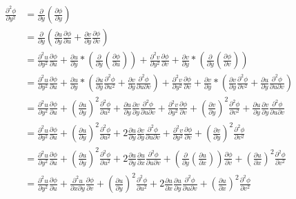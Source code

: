 \documentclass{article}
\begin{document}
\begin{equation*}
\begin{split}
    \frac{\partial^2\phi}{\partial y^2}&=
    \frac{\partial}{\partial y}(\frac{\partial\phi}{\partial y})\\&=
    \frac{\partial}{\partial y}(\frac{\partial u}{\partial y}\frac{\partial\phi}{\partial u}+\frac{\partial v}{\partial y}\frac{\partial\phi}{\partial v})\\&=
    \frac{\partial^2 u}{\partial y^2}\frac{\partial \phi}{\partial u}+\frac{\partial u}{\partial y}*(\frac{\partial }{\partial y}(\frac{\partial \phi}{\partial u}))+\frac{\partial^2 v}{\partial y^2}\frac{\partial \phi}{\partial v}+\frac{\partial v}{\partial y}*(\frac{\partial }{\partial y}(\frac{\partial \phi}{\partial v}))\\&=
    \frac{\partial^2 u}{\partial y^2}\frac{\partial \phi}{\partial u}+\frac{\partial u}{\partial y}*(\frac{\partial u}{\partial y}\frac{\partial^2 \phi}{\partial u^2}+\frac{\partial v}{\partial y}\frac{\partial^2 \phi}{\partial u \partial v})+\frac{\partial^2 v}{\partial y^2}\frac{\partial \phi}{\partial v}+\frac{\partial v}{\partial y}*(\frac{\partial  v}{\partial y}\frac{\partial^2 \phi}{\partial v^2}+\frac{\partial u}{\partial y}\frac{\partial^2 \phi}{\partial u \partial v})\\&=
    \frac{\partial^2 u}{\partial y^2}\frac{\partial \phi}{\partial u}+(\frac{\partial u}{\partial y})^2\frac{\partial^2 \phi}{\partial u^2}+\frac{\partial u}{\partial y}\frac{\partial v}{\partial y}\frac{\partial^2 \phi}{\partial u \partial v}+\frac{\partial^2 v}{\partial y^2}\frac{\partial \phi}{\partial v}+(\frac{\partial v}{\partial y})^2\frac{\partial^2 \phi}{\partial v^2}+\frac{\partial u}{\partial y}\frac{\partial v}{\partial y}\frac{\partial^2 \phi}{\partial u \partial v}\\&=
    \frac{\partial^2 u}{\partial y^2}\frac{\partial \phi}{\partial u}+(\frac{\partial u}{\partial y})^2\frac{\partial^2 \phi}{\partial u^2}+2\frac{\partial u}{\partial y}\frac{\partial v}{\partial y}\frac{\partial^2 \phi}{\partial u \partial v}+\frac{\partial^2 v}{\partial y^2}\frac{\partial \phi}{\partial v}+(\frac{\partial v}{\partial y})^2\frac{\partial^2 \phi}{\partial v^2}\\&=
    \frac{\partial^2 u}{\partial y^2}\frac{\partial \phi}{\partial u}+(\frac{\partial u}{\partial y})^2\frac{\partial^2 \phi}{\partial u^2}+2\frac{\partial u}{\partial y}\frac{\partial u}{\partial x}\frac{\partial^2 \phi}{\partial u \partial v}+(\frac{\partial}{\partial y}(\frac{\partial u}{\partial x}))\frac{\partial \phi}{\partial v}+(\frac{\partial u}{\partial x})^2\frac{\partial^2 \phi}{\partial v^2}\\&=
    \frac{\partial^2 u}{\partial y^2}\frac{\partial \phi}{\partial u}+\frac{\partial^2 u}{\partial x \partial y}\frac{\partial \phi}{\partial v}+(\frac{\partial u}{\partial y})^2\frac{\partial^2 \phi}{\partial u^2}+2\frac{\partial u}{\partial x}\frac{\partial u}{\partial y}\frac{\partial^2 \phi}{\partial u \partial v}+(\frac{\partial u}{\partial x})^2\frac{\partial^2 \phi}{\partial v^2}
\end{split}
\end{equation*}
\end{document}
